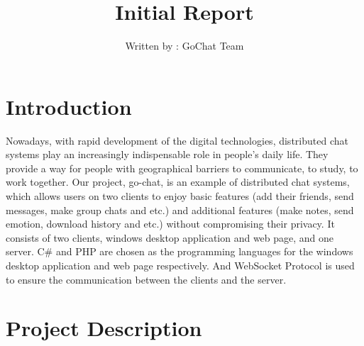 \documentclass[a4paper]{article}
\title{Initial Report}
\author{Written by : GoChat Team}
\begin{document}
\maketitle


\section{Introduction}

Nowadays, with rapid development of the digital technologies, distributed chat systems play an increasingly indispensable role in people’s daily life. They provide a way for people with geographical barriers to communicate, to study, to work together. 
Our project, go-chat, is an example of distributed chat systems, which allows users on two clients to enjoy basic features (add their friends, send messages, make group chats and etc.) and additional features (make notes, send emotion, download history and etc.) without compromising their privacy. It consists of two clients, windows desktop application and web page, and one server. C\# and PHP are chosen as the programming languages for the windows desktop application and web page respectively. And WebSocket Protocol is used to ensure the communication between the clients and the server. 











\section{Project Description}
\end{document}
